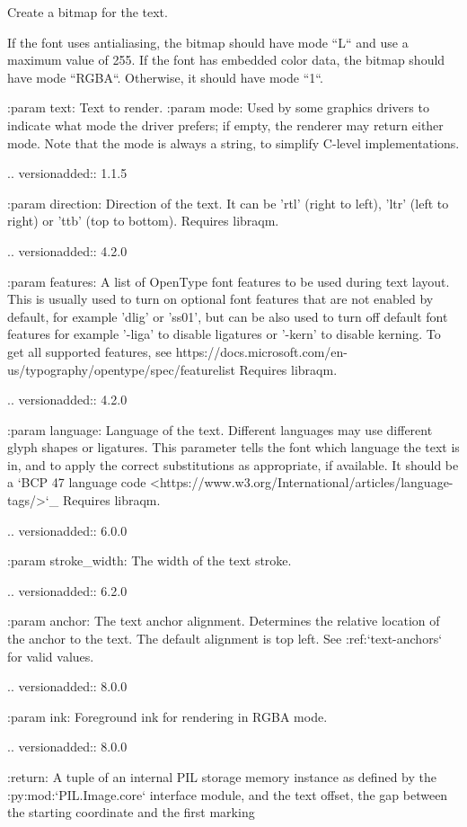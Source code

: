 \begin{DoxyVerb}Create a bitmap for the text.

If the font uses antialiasing, the bitmap should have mode ``L`` and use a
maximum value of 255. If the font has embedded color data, the bitmap
should have mode ``RGBA``. Otherwise, it should have mode ``1``.

:param text: Text to render.
:param mode: Used by some graphics drivers to indicate what mode the
     driver prefers; if empty, the renderer may return either
     mode. Note that the mode is always a string, to simplify
     C-level implementations.

     .. versionadded:: 1.1.5

:param direction: Direction of the text. It can be 'rtl' (right to
          left), 'ltr' (left to right) or 'ttb' (top to bottom).
          Requires libraqm.

          .. versionadded:: 4.2.0

:param features: A list of OpenType font features to be used during text
         layout. This is usually used to turn on optional
         font features that are not enabled by default,
         for example 'dlig' or 'ss01', but can be also
         used to turn off default font features for
         example '-liga' to disable ligatures or '-kern'
         to disable kerning.  To get all supported
         features, see
         https://docs.microsoft.com/en-us/typography/opentype/spec/featurelist
         Requires libraqm.

         .. versionadded:: 4.2.0

:param language: Language of the text. Different languages may use
         different glyph shapes or ligatures. This parameter tells
         the font which language the text is in, and to apply the
         correct substitutions as appropriate, if available.
         It should be a `BCP 47 language code
         <https://www.w3.org/International/articles/language-tags/>`_
         Requires libraqm.

         .. versionadded:: 6.0.0

:param stroke_width: The width of the text stroke.

         .. versionadded:: 6.2.0

:param anchor:  The text anchor alignment. Determines the relative location of
        the anchor to the text. The default alignment is top left.
        See :ref:`text-anchors` for valid values.

         .. versionadded:: 8.0.0

:param ink: Foreground ink for rendering in RGBA mode.

         .. versionadded:: 8.0.0

:return: A tuple of an internal PIL storage memory instance as defined by the
 :py:mod:`PIL.Image.core` interface module, and the text offset, the
 gap between the starting coordinate and the first marking
\end{DoxyVerb}
